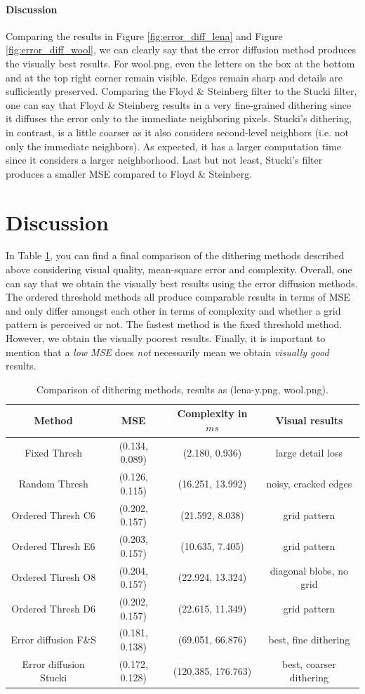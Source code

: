 \documentclass{article}
\begin{document}
\paragraph{Discussion} Comparing the results in Figure \ref{fig:error_diff_lena} and Figure \ref{fig:error_diff_wool}, we can clearly say that the error diffusion method produces the visually best results. For \textsf{wool.png}, even the letters on the box at the bottom and at the top right corner remain visible. Edges remain sharp and details are sufficiently preserved. Comparing the Floyd \& Steinberg filter to the Stucki filter, one can say that Floyd \& Steinberg results in a very fine-grained dithering since it diffuses the error only to the immediate neighboring pixels. Stucki's dithering, in contrast, is a little coarser as it also considers second-level neighbors (i.e. not only the immediate neighbors). As expected, it has a larger computation time since it considers a larger neighborhood. Last but not least, Stucki's filter produces a smaller MSE compared to Floyd \& Steinberg.

\section{Discussion}\label{sec:discussion}
In Table \ref{tab:1}, you can find a final comparison of the dithering methods described above considering visual quality, mean-square error and complexity. Overall, one can say that we obtain the visually best results using the error diffusion methods. The ordered threshold methods all produce comparable results in terms of MSE and only differ amongst each other in terms of complexity and whether a grid pattern is perceived or not. The fastest method is the fixed threshold method. However, we obtain the visually poorest results. Finally, it is important to mention that a \textit{low MSE} does \textit{not} necessarily mean we obtain \textit{visually good} results.
\begin{table}
\centering
\caption{Comparison of dithering methods, results as (\textsf{lena-y.png}, \textsf{wool.png}).}
\begin{tabular}{ c || c | c | c}
 Method & MSE & Complexity in $ms$& Visual results \\ 
 \hline
 Fixed Thresh & (0.134, 0.089) & (2.180, 0.936) & large detail loss\\  
 Random Thresh & (0.126, 0.115) & (16.251, 13.992) & noisy, cracked edges \\ 
 Ordered Thresh C6 & (0.202, 0.157) & (21.592, 8.038) & grid pattern \\ 
 Ordered Thresh E6 & (0.203, 0.157) & (10.635, 7.405) & grid pattern \\ 
 Ordered Thresh O8 & (0.204, 0.157) & (22.924, 13.324) & diagonal blobs, no grid \\
 Ordered Thresh D6 & (0.202, 0.157) & (22.615, 11.349) & grid pattern \\  
 Error diffusion F\&S & (0.181, 0.138) & (69.051, 66.876) & best, fine dithering \\ 
 Error diffusion Stucki& (0.172, 0.128) & (120.385, 176.763) & best, coarser dithering 
\end{tabular}
\label{tab:1}
\end{table}
\end{document}

